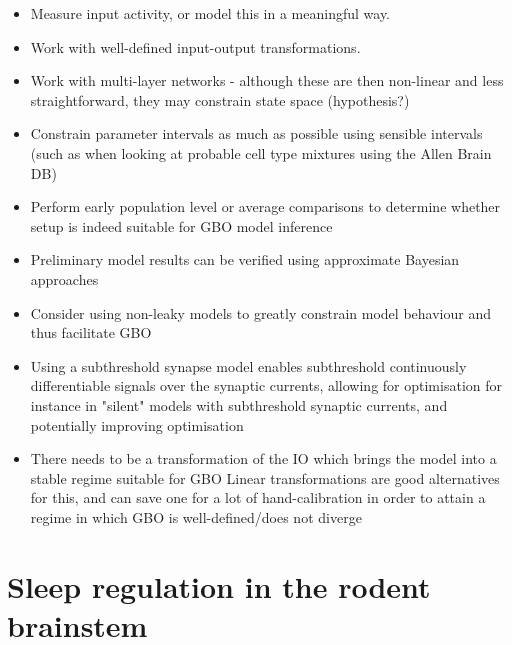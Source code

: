\documentclass[mphil,deptreport,ianc]{infthesis} %
\begin{document}
\begin{itemize}
    \item Measure input activity, or model this in a meaningful way.
    \item Work with well-defined input-output transformations.
    \item Work with multi-layer networks - although these are then non-linear and less straightforward, they may constrain state space (hypothesis?)
    \item Constrain parameter intervals as much as possible using sensible intervals (such as when looking at probable cell type mixtures using the Allen Brain DB)
    \item Perform early population level or average comparisons to determine whether setup is indeed suitable for GBO model inference
    \item Preliminary model results can be verified using approximate Bayesian approaches
    \item Consider using non-leaky models to greatly constrain model behaviour and thus facilitate GBO
    \item Using a subthreshold synapse model enables subthreshold continuously differentiable signals over the synaptic currents, allowing for optimisation for instance in "silent" models with subthreshold synaptic currents, and potentially improving optimisation
    \item There needs to be a transformation of the IO which brings the model into a stable regime suitable for GBO
        Linear transformations are good alternatives for this, and can save one for a lot of hand-calibration in order to attain a regime in which GBO is well-defined/does not diverge
\end{itemize}


\chapter{Sleep regulation in the rodent brainstem}
\end{document}
